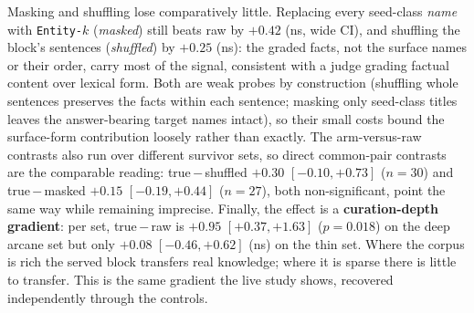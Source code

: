 \documentclass[10pt,twocolumn]{article}
\begin{document}
Masking and shuffling lose comparatively little. Replacing every seed-class \emph{name} with
\texttt{Entity-$k$} (\emph{masked}) still beats raw by $+0.42$ (ns, wide CI), and shuffling the block's
sentences (\emph{shuffled}) by $+0.25$ (ns): the graded facts, not the surface names or their order,
carry most of the signal, consistent with a judge grading factual content over lexical form. Both are
weak probes by construction (shuffling whole sentences preserves the facts within each sentence;
masking only seed-class titles leaves the answer-bearing target names intact), so their small costs
bound the surface-form contribution loosely rather than exactly. The arm-versus-raw contrasts also run
over different survivor sets, so direct common-pair contrasts are the comparable reading:
true\,$-$\,shuffled $+0.30$ $[-0.10,+0.73]$ ($n=30$) and true\,$-$\,masked $+0.15$ $[-0.19,+0.44]$
($n=27$), both non-significant, point the same way while remaining imprecise. Finally,
the effect is a \textbf{curation-depth gradient}: per set, true\,$-$\,raw is $+0.95$ $[+0.37,+1.63]$
($p=0.018$) on the deep arcane set but only $+0.08$ $[-0.46,+0.62]$ (ns) on the thin set. Where the
corpus is rich the served block transfers real knowledge; where it is sparse there is little to
transfer. This is the same gradient the live study shows, recovered independently through the controls.
\end{document}
